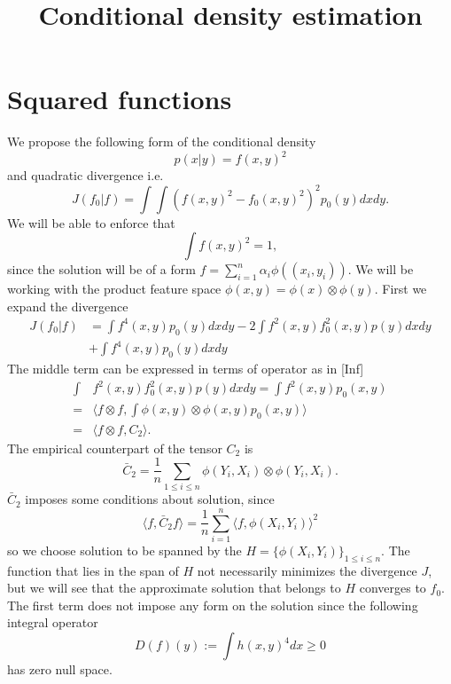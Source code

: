 \documentclass[10pt]{article}
\title{Conditional density estimation}
\begin{document}
\maketitle

\begin{abstract}
\end{abstract}



\section{Squared functions}
We propose the following form of the conditional density 
\begin{equation}
 p(x|y) = f(x,y)^2
\end{equation}
and quadratic  divergence i.e.
\begin{equation}
 J(f_0|f) = \int \int (f(x,y)^2 - f_0(x,y)^2)^2 p_0(y) dx dy. 
\end{equation}
We will be able to enforce that 
\begin{equation}
\int f(x,y)^2 =1,  
\end{equation}
since the solution will be of a form $f = \sum_{i=1}^n \alpha_i \phi((x_i,y_i))$. We will be working with the product feature space  $\phi(x,y) = \phi(x) \otimes \phi(y)$. First we expand the divergence
\begin{align}
 J(f_0|f) &= \int f^4(x,y) p_0(y) dx dy - 2 \int f^2(x,y) f_0^2(x,y) p(y) dx dy  \\
 &+ \int f^4(x,y) p_0(y) dx dy 
\end{align}
The middle term can be expressed in terms of operator as in [Inf] 
\begin{align}
\int &f^2(x,y) f_0^2(x,y) p(y) dx dy = \int f^2(x,y) p_0(x,y) \\
 =&  \langle f \otimes f  , \int \phi(x,y) \otimes \phi(x,y) p_0(x,y) \rangle \\
 =& \langle f \otimes f  , C_2 \rangle.
\end{align}
The empirical counterpart of the tensor $C_2$ is
\begin{equation}
 \bar C_2 = \frac 1 n \sum_{1 \leq i \leq n } \phi(Y_{i},X_{i}) \otimes \phi(Y_{i},X_{i}). 
\end{equation}
$\bar C_2$ imposes some conditions about solution, since 
\begin{equation}
 \langle f, \bar C_2 f \rangle = \frac 1 n \sum_{i=1}^n \langle f , \phi(X_i,Y_i) \rangle^2   
\end{equation}
so we choose solution to be spanned by the $H = \{ \phi(X_i,Y_i) \}_{1 \leq i \leq n}$. The function that lies in the span of $H$ not necessarily minimizes the divergence $J$, but we will see that the approximate solution that belongs to $H$ converges to $f_0$. The first term does not impose any form on the solution since the following integral operator
\begin{equation}
D(f)(y) := \int h(x,y)^4 dx \geq 0
\end{equation}
has zero null space.
\end{document}
